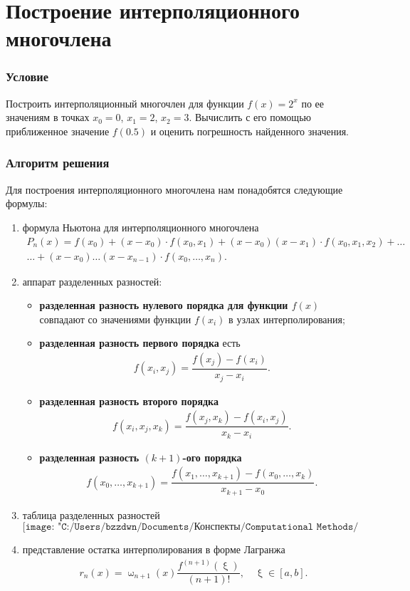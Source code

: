 \documentclass[a4paper, 12pt]{article}
\renewcommand{\omega}{\upomega}
\renewcommand{\xi}{\upxi}
\begin{document}
	\section*{Построение интерполяционного многочлена}
	\subsubsection*{Условие}
	Построить интерполяционный многочлен для функции $f(x) = 2^x$ по ее значениям в точках $x_0 = 0$, $x_1 = 2$, $x_2 = 3$. Вычислить с его помощью приближенное значение $f(0.5)$ и оценить погрешность найденного значения.
	\subsubsection*{Алгоритм решения}
	Для построения интерполяционного многочлена нам понадобятся следующие формулы:
	\begin{enumerate}
		\item формула Ньютона для интерполяционного многочлена \begin{multline}
			P_n(x) = f(x_0) + (x-x_0)\cdot f(x_0, x_1) + (x-x_0)(x-x_1)\cdot f(x_0,x_1,x_2) +\ldots \\ \ldots + (x-x_0)\ldots (x-x_{n-1})\cdot f(x_0,\ldots, x_n).
		\end{multline}
		\item аппарат разделенных разностей:
		\begin{itemize}
			\item \textbf{разделенная разность нулевого порядка для функции $f(x)$} совпадают со значениями функции $f(x_i)$ в узлах интерполирования;
			\item \textbf{разделенная разность первого порядка} есть \begin{eqnarray}
			f(x_i, x_j) = \dfrac{f(x_j) - f(x_i)}{x_j - x_i}.
			\end{eqnarray}
			\item \textbf{разделенная разность второго порядка} \begin{eqnarray}
			f(x_i, x_j, x_k) = \dfrac{f(x_j, x_k) - f(x_i, x_j)}{x_k - x_i}.
			\end{eqnarray}
			\item \textbf{разделенная разность $(k+1)$-ого порядка} \begin{eqnarray}
			f(x_0, \ldots, x_{k+1}) = \dfrac{f(x_1,\ldots, x_{k+1}) - f(x_0,\ldots, x_k)}{x_{k+1} - x_0}.
			\end{eqnarray}
		\end{itemize}
			 \item таблица разделенных разностей
			 	$$
			 	\texttt{[image: "C:/Users/bzzdwn/Documents/Конспекты/Computational Methods/img9"]}
			 	$$
			\item представление остатка интерполирования в форме Лагранжа
			\begin{eqnarray}
				r_n(x) = \omega_{n+1}(x) \dfrac{f^{(n+1)}(\xi)}{(n+1)!},\quad \xi \in [a,b].
			\end{eqnarray}
	\end{enumerate}
\end{document}
